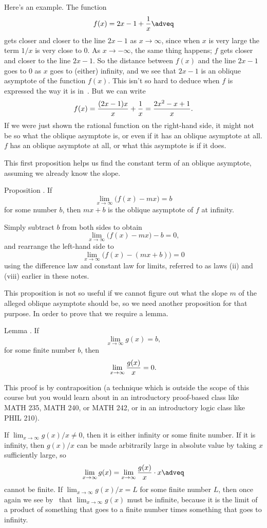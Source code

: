 Here's an example. The function
\edef\eqoblique{\the\eqcount}
$$f(x) = 2x-1 + {1\over x}\adveq$$
gets closer and closer to the line $2x-1$ as $x\to\infty$, since when $x$ is very large the term $1/x$ is very
close to $0$. As $x\to -\infty$, the same thing happens; $f$ gets closer and closer to the line $2x-1$.
So the distance between $f(x)$ and the line $2x-1$ goes to $0$ as $x$ goes to (either) infinity,
and we see that $2x-1$ is an oblique asymptote of the function $f(x)$.
This isn't so hard to deduce when $f$ is expressed the way it is in~\refeq{\eqoblique}. But we can write
$$f(x) = {(2x-1)x\over x} + {1\over x} = {2x^2-x+1\over x}.$$
If we were just shown the rational function on the right-hand side, it might not be so what the oblique
asymptote is, or even if it has an oblique asymptote at all.
$f$ has an oblique asymptote at all, or what this asymptote is if it does.

This first proposition helps us find the constant term of an oblique asymptote, assuming we already
know the slope.

\edef\propobliqueb{\the\thmcount}
\proclaim Proposition \advthm. If
$$\lim_{x\to \infty} \bigl( f(x) - mx\bigr) = b$$
for some number $b$, then $mx+b$ is the oblique asymptote of $f$ at infinity.

\proof Simply subtract $b$ from both sides to obtain
$$\lim_{x\to \infty} \bigl( f(x) - mx\bigr) - b = 0,$$
and rearrange the left-hand side to
$$\lim_{x\to \infty} \bigl( f(x) - (mx+b)\bigr) = 0$$
using the difference law and constant law for limits, referred to as laws (ii) and (viii) earlier
in these notes.\slug

This proposition is not so useful if we cannot figure out what the slope $m$ of the alleged oblique asymptote
should be, so we need another proposition for that purpose. In order to prove that we require a lemma.

\proclaim Lemma \advthm. If
$$\lim_{x\to \infty} g(x) = b,$$
for some finite number $b$,
then
$$\lim_{x\to \infty} {g(x)\over x} = 0.$$

\optproof This proof is by contraposition (a technique which is outside the scope of this course but
you would learn about in an introductory proof-based class like {\mc MATH} 235, {\mc MATH} 240, or
{\mc MATH} 242, or in an introductory logic class like {\mc PHIL} 210).

If $\lim_{x\to \infty} g(x)/x \ne 0$, then it is either infinity or some finite number. If it is
infinity, then $g(x)/x$ can be made arbitrarily large in absolute value by taking $x$ sufficiently large,
so
\edef\lemgoverxzero{\the\eqcount}
$$\lim_{x\to \infty} g(x) = \lim_{x\to \infty} {g(x)\over x}\cdot x\adveq$$
cannot be finite. If $\lim_{x\to\infty} g(x)/x = L$ for some finite number $L$, then once again we see
by~\refeq{\lemgoverxzero} that $\lim_{x\to\infty} g(x)$ must be infinite, because it is the limit of
a product of something that goes to a finite number times something that goes to infinity.

